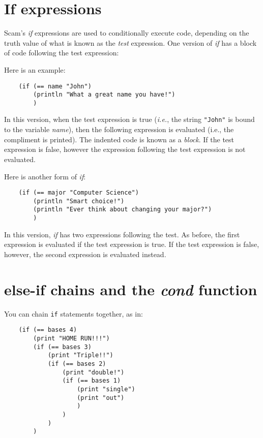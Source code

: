 \section{If expressions}

Scam's {\it if} expressions are used to conditionally execute code,
depending on the truth value of what is known as the
{\it test} expression. One version of {\it if} has a block of
code following the test expression:

Here is an example:

\begin{verbatim}
    (if (== name "John")
        (println "What a great name you have!")
        )
\end{verbatim}

In this version, when the test expression is true ({\it i.e.}, 
the string {\tt "John"} is bound to the variable {\it name}), 
then the following expression is evaluated 
(i.e., the compliment
is printed). The indented code is known as a {\it block}.
If the test expression is false, however the
expression following the test expression is not evaluated.

Here is another form of {\it if}:

\begin{verbatim}
    (if (== major "Computer Science")
        (println "Smart choice!")
        (println "Ever think about changing your major?")
        )
\end{verbatim}

In this version, {\it if} has two expressions following
the test.
As before, the first expression is evaluated if the test expression
is true. If the test expression is false, however,
the second expression is evaluated instead.

\section{else-if chains and the {\it cond} function}

You can chain {\tt if} statements together, as in:

\begin{verbatim}
    (if (== bases 4)
        (print "HOME RUN!!!")
        (if (== bases 3)
            (print "Triple!!")
            (if (== bases 2)
                (print "double!")
                (if (== bases 1) 
                    (print "single")
                    (print "out")
                    )
                )
            )
        )
\end{verbatim}

